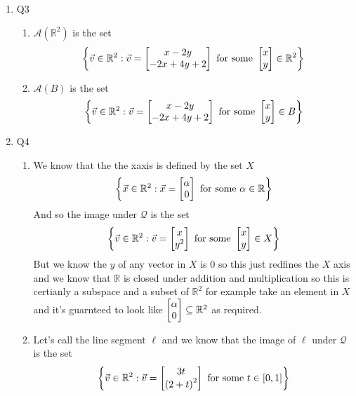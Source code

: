 \documentclass[11pt]{book}
\begin{document}
\begin{enumerate}
    \item Q3
    \begin{enumerate}
        \item $\mathcal{A}\left(\mathbb{R}^2 \right) $ is the set
            \begin{gather*}
                \left\{ \vec{v} \in \mathbb{R}^2 :\vec{v} = \begin{bmatrix} x - 2y \\ -2x + 4y + 2 \end{bmatrix} \text{ for some  } \begin{bmatrix} x \\ y \end{bmatrix} \in \mathbb{R}^2  \right\} 
            \end{gather*}
        \item $\mathcal{A}\left(B\right) $ is the set
            \begin{gather*}
                \left\{ \vec{v} \in \mathbb{R}^2 :\vec{v} = \begin{bmatrix} x - 2y \\ -2x + 4y + 2 \end{bmatrix} \text{ for some  } \begin{bmatrix} x \\ y \end{bmatrix} \in B  \right\} 
            \end{gather*}
    \end{enumerate}
    \item Q4
    \begin{enumerate}
        \item We know that the the xaxis is defined by the set $X$ 
            \[
            \left\{ \vec{x} \in \mathbb{R}^2 :\vec{x} = \begin{bmatrix} \alpha  \\ 0 \end{bmatrix} \text{ for some  } \alpha \in \mathbb{R}  \right\} 
            \]
            And so the image under $\mathcal{Q} $ is the set 
            \begin{gather*}
                \left\{ \vec{v} \in \mathbb{R}^2 :\vec{v} = \begin{bmatrix} x \\ y^2  \end{bmatrix} \text{ for some  } \begin{bmatrix} x \\ y \end{bmatrix} \in X \right\} 
            \end{gather*}
            But we know the $y$ of any vector in $X$ is 0 so this just redfines the $X$ axis and we know that $\mathbb{R} $ is closed under addition and multiplication so this is certianly a subspace and a subset of $\mathbb{R}^2 $ for example take an element in $X$ and it's guarnteed to look like $\begin{bmatrix} \alpha  \\ 0 \end{bmatrix} \subseteq \mathbb{R}^2 $ as required.
        \item Let's call the line segment $\ell $ and we know that the image of $\ell $ under $\mathcal{Q} $ is the set
            \[
                \left\{ \vec{v} \in \mathbb{R}^2 :\vec{v} = \begin{bmatrix} 3t \\ \left( 2 + t \right) ^2  \end{bmatrix} \text{ for some  } t \in \left[ 0,1 \right]  \right\} 
\]
\end{enumerate}
\end{enumerate}
\end{document}

